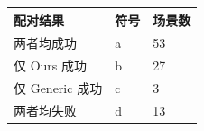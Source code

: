 \begin{tabular}{lll}
\toprule
配对结果 & 符号 & 场景数 \\
\midrule
两者均成功 & a & 53 \\
仅 Ours 成功 & b & 27 \\
仅 Generic 成功 & c & 3 \\
两者均失败 & d & 13 \\
\bottomrule
\end{tabular}
